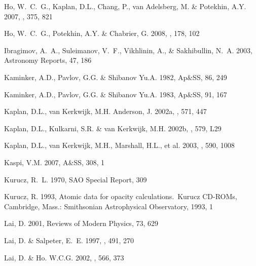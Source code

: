 \documentclass{aa}
\begin{document}
\begin{thebibliography}{}
{Ho}, W.~C.~G.,  {Kaplan}, D.L., {Chang}, P., {van Adelsberg}, M. \& {Potekhin}, 
 A.Y. 2007, \mnras, 375, 821 
 
{Ho}, W.~C.~G., {Potekhin}, A.Y. \& {Chabrier}, G. 
2008, \apjs, 178, 102 
 
{Ibragimov}, A.~A., {Suleimanov}, V.~F., {Vikhlinin}, A., \& {Sakhibullin}, 
  N.~A. 2003, Astronomy Reports, 47, 186 
 
 {Kaminker}, A.D.,  {Pavlov}, G.G. \& {Shibanov} Yu.A. 
 1982, Ap\&SS, 86, 249 
 
 {Kaminker}, A.D.,  {Pavlov}, G.G. \& {Shibanov} Yu.A. 
 1983, Ap\&SS, 91, 167 
 
 {Kaplan}, D.L., {van Kerkwijk}, M.H. {Anderson}, J. 
 2002a, \apj, 571, 447 
 
 {Kaplan}, D.L.,  {Kulkarni}, S.R. \& {van Kerkwijk}, M.H. 
 2002b, \apj, 579, L29 
 
 {Kaplan}, D.L., {van Kerkwijk}, M.H., {Marshall}, H.L., et al. 
 2003, \apj, 590, 1008 
 
{Kaspi}, V.M. 2007, A\&SS, 308, 1 
 
{Kurucz}, R.~L. 1970, SAO Special Report, 309 
 
{Kurucz}, R. 1993, Atomic data for opacity calculations.~Kurucz CD-ROMs, 
  Cambridge, Mass.: Smithsonian Astrophysical Observatory, 1993, 1 
 
{Lai}, D. 2001, Reviews of Modern Physics, 73, 629 
 
{Lai}, D. \& {Salpeter}, E.~E. 1997, \apj, 491, 270 
 
{Lai}, D. \& Ho. W.C.G. 
2002, \apj, 566, 373 
 

\end{thebibliography}
\end{document}

